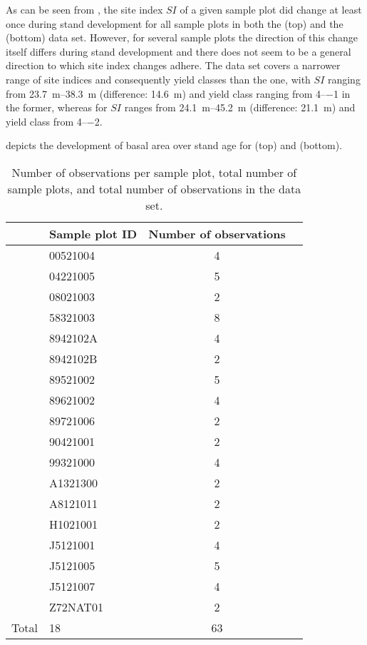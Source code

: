 As can be seen from , the site index \(SI\) of a given sample plot did change at least once during stand development for all sample plots in both the \Beech{} (top) and the \Spruce{} (bottom) data set.  However, for several sample plots the direction of this change itself differs during stand development and there does not seem to be a general direction to which site index changes adhere.  The \Beech{} data set covers a narrower range of site indices and consequently yield classes than the \Spruce{} one, with \(SI\) ranging from \SIrange{23.7}{38.3}{\meter} (difference: \SI{14.6}{\meter}) and yield class ranging from \numrange{4}{-1} in the former, whereas for \Spruce{} \(SI\) ranges from \SIrange{24.1}{45.2}{\meter} (difference: \SI{21.1}{\meter}) and yield class from \numrange{4}{-2}.

 depicts the development of basal area over stand age for \Beech{} (top) and \Spruce{} (bottom).  %

\newpage{}  %
\begin{singlespace}
  {\tabulinesep=2mm
    \begin{longtabu}{l l S L}
      \caption{Number of observations per sample plot, total number of sample plots, and total number of observations in the \Beech{} data set. \label{tab:ObservationsCountPerEdvidBeech}} \\
      \toprule
      & Sample plot ID & {Number of observations} &  \\
      \midrule
      \endhead
      \bottomrule
      \endlastfoot
      & 00521004 & 4 \\
      & 04221005 & 5 \\
      & 08021003 & 2 \\
      & 58321003 & 8 \\
      & 8942102A & 4 \\
      & 8942102B & 2 \\
      & 89521002 & 5 \\
      & 89621002 & 4 \\
      & 89721006 & 2 \\
      & 90421001 & 2 \\
      & 99321000 & 4 \\
      & A1321300 & 2 \\
      & A8121011 & 2 \\
      & H1021001 & 2 \\
      & J5121001 & 4 \\
      & J5121005 & 5 \\
      & J5121007 & 4 \\
      & Z72NAT01 & 2 \\
      Total & 18 & 63 \\
    \end{longtabu}
  }
\end{singlespace}

